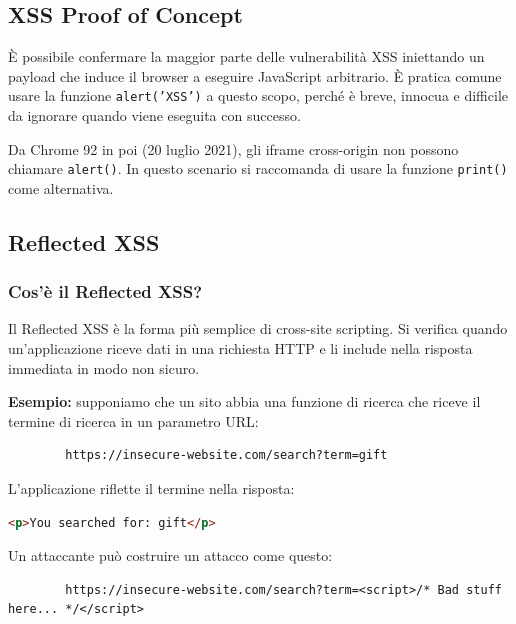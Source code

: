 \documentclass[12pt,a4paper]{report}
\begin{document}
	\subsection{XSS Proof of Concept}
	
	È possibile confermare la maggior parte delle vulnerabilità XSS iniettando un payload che induce il browser a eseguire JavaScript arbitrario. È pratica comune usare la funzione \texttt{alert('XSS')} a questo scopo, perché è breve, innocua e difficile da ignorare quando viene eseguita con successo.
	
	\begin{nota}
		Da Chrome 92 in poi (20 luglio 2021), gli iframe cross-origin non possono chiamare \texttt{alert()}. In questo scenario si raccomanda di usare la funzione \texttt{print()} come alternativa.
	\end{nota}
	
	\subsection{Reflected XSS}
	
	\subsubsection{Cos'è il Reflected XSS?}
	
	Il Reflected XSS è la forma più semplice di cross-site scripting. Si verifica quando un'applicazione riceve dati in una richiesta HTTP e li include nella risposta immediata in modo non sicuro.
	
	\textbf{Esempio:} supponiamo che un sito abbia una funzione di ricerca che riceve il termine di ricerca in un parametro URL:
	
	\begin{lstlisting}
		https://insecure-website.com/search?term=gift
	\end{lstlisting}
	
	L'applicazione riflette il termine nella risposta:
	
	\begin{lstlisting}[language=HTML]
		<p>You searched for: gift</p>
	\end{lstlisting}
	
	Un attaccante può costruire un attacco come questo:
	
	\begin{lstlisting}
		https://insecure-website.com/search?term=<script>/* Bad stuff here... */</script>
	\end{lstlisting}
	
\end{document}

